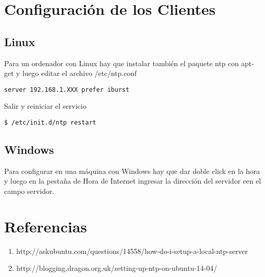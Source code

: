 \documentclass{article}
\begin{document}
\section{Configuraci\'on de los Clientes}
\subsection{Linux}
Para un ordenador con Linux hay que instalar tambi\'en el paquete ntp con apt-get y luego editar el archivo /etc/ntp.conf
\begin{verbatim}
server 192.168.1.XXX prefer iburst
\end{verbatim}
Salir y reiniciar el servicio
\begin{verbatim}
$ /etc/init.d/ntp restart
\end{verbatim}
\subsection{Windows}
Para configurar en una m\'aquina con Windows hay que dar doble click en la hora y luego en la pesta\~na de Hora de Internet ingresar la direcci\'on del servidor een el campo servidor.
\section{Referencias}
\begin{enumerate}
\item http://askubuntu.com/questions/14558/how-do-i-setup-a-local-ntp-server
\item http://blogging.dragon.org.uk/setting-up-ntp-on-ubuntu-14-04/
\end{enumerate}
\end{document}
